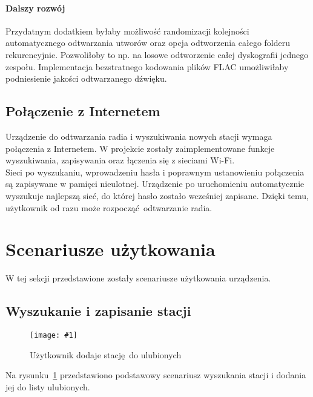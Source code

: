 \documentclass[polish]{aghengthesis}
\newcommand{\imgint}[4]{
	\begin{figure}[{#4}]
		\centering
		\texttt{[image: \#1]}
		\caption{#2}
		\label{#1}
	\end{figure}
}
\newcommand{\imgh}[3]{\imgint{#1}{#2}{#3}{H}}
\begin{document}
			\paragraph{Dalszy rozwój}
				Przydatnym dodatkiem byłaby możliwość randomizacji kolejności automatycznego odtwarzania utworów oraz opcja odtworzenia całego folderu rekurencyjnie. Pozwoliłoby to np. na losowe odtworzenie całej dyskografii jednego zespołu. Implementacja bezstratnego kodowania plików FLAC umożliwiłaby podniesienie jakości odtwarzanego dźwięku.
		
		\subsection{Połączenie z Internetem}
			Urządzenie do odtwarzania radia i wyszukiwania nowych stacji wymaga połączenia z Internetem. W projekcie zostały zaimplementowane funkcje wyszukiwania, zapisywania oraz łączenia się z sieciami Wi-Fi.
			$ $\\
			
			Sieci po wyszukaniu, wprowadzeniu hasła i poprawnym ustanowieniu połączenia są zapisywane w pamięci nieulotnej. Urządzenie po uruchomieniu automatycznie wyszukuje najlepszą sieć, do której hasło zostało wcześniej zapisane. Dzięki temu, użytkownik od razu może rozpocząć odtwarzanie radia.
	
	\section{Scenariusze użytkowania}
		W tej sekcji przedstawione zostały scenariusze użytkowania urządzenia.
	
		\subsection{Wyszukanie i zapisanie stacji}
			\imgh{5/PicoRadio-fl-add}{Użytkownik dodaje stację do ulubionych}{0.9}
			\newcommand{\rfladd}[1]{\ref{5/PicoRadio-fl-add}#1}
			
			Na rysunku~\rfladd{} przedstawiono podstawowy scenariusz wyszukania stacji i dodania jej do listy ulubionych.
			
\end{document}
